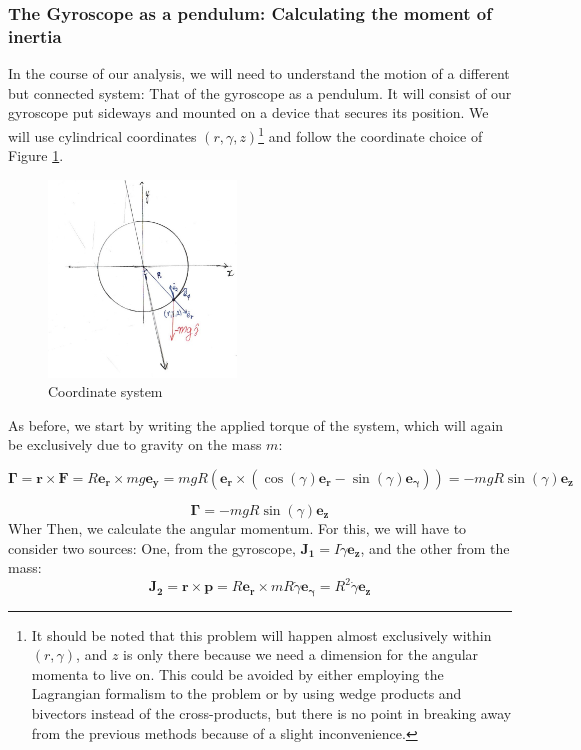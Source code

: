 \documentclass[a4paper,12pt]{article}
\begin{document}
\subsubsection{The Gyroscope as a pendulum: Calculating the moment of inertia}

In the course of our analysis, we will need to understand the motion of a different but connected system: That of the gyroscope as a pendulum. It will consist of our gyroscope put sideways and mounted on a device that secures its position. We will use cylindrical coordinates $(r,\gamma,z)$\footnote{It should be noted that this problem will happen almost exclusively within $(r,\gamma)$, and $z$ is only there because we need a dimension for the angular momenta to live on. This could be avoided by either employing the Lagrangian formalism to the problem or by using wedge products and bivectors instead of the cross-products, but there is no point in breaking away from the previous methods because of a slight inconvenience.} and follow the coordinate choice of Figure \ref{cordinate}.

\begin{figure}[h!]
	\centering
	\label{cordinate}
	\caption{Coordinate system}
	\includegraphics[width=5cm]{coord2.jpg}
\end{figure} 

As before, we start by writing the applied torque of the system, which will again be exclusively due to gravity on the mass $m$:

\begin{equation*}
	\boldsymbol{\Gamma} = \boldsymbol{r} \times \boldsymbol{F} = R \boldsymbol{e_r} \times mg \boldsymbol{e_y} = mgR\left(\boldsymbol{e_r} \times \left(\cos(\gamma)\boldsymbol{e_r} - \sin(\gamma) \boldsymbol{e_\gamma}\right)\right) = -mgR \sin(\gamma) \boldsymbol{e_z}
\end{equation*}

\begin{equation}
	\label{torque2}
	\boldsymbol{\Gamma} = -mgR \sin(\gamma) \boldsymbol{e_z}
\end{equation}
Wher
Then, we calculate the angular momentum. For this, we will have to consider two sources: One, from the gyroscope, $\boldsymbol{J_1} = I \dot{\gamma} \boldsymbol{e_z}$, and the other from the mass:
$$\boldsymbol{J_2} = \boldsymbol{r} \times \boldsymbol{p} = R \boldsymbol{e_r} \times mR \dot{\gamma} \boldsymbol{e_\gamma} = R^2 \dot{\gamma} \boldsymbol{e_z}$$
\end{document}
